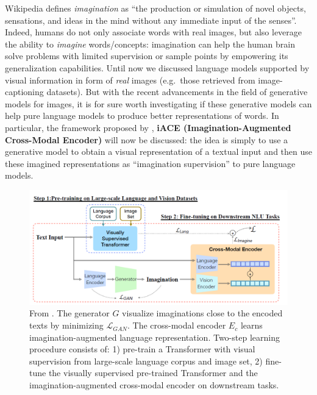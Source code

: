 \documentclass[
]{krantz}
\begin{document}
Wikipedia defines \emph{imagination} as ``the production or simulation of novel objects, sensations, and ideas in the mind without any immediate input of the senses''. Indeed, humans do not only associate words with real images, but also leverage the ability to \emph{imagine} words/concepts: imagination can help the human brain solve problems with limited supervision or sample points by empowering its generalization capabilities. Until now we discussed language models supported by visual information in form of \emph{real} images (e.g.~those retrieved from image-captioning datasets). But with the recent advancements in the field of generative models for images, it is for sure worth investigating if these generative models can help pure language models to produce better representations of words. In particular, the framework proposed by \citet{lu2022imagination}, \textbf{iACE (Imagination-Augmented Cross-Modal Encoder)} will now be discussed: the idea is simply to use a generative model to obtain a visual representation of a textual input and then use these imagined representations as ``imagination supervision'' to pure language models.

\begin{figure}

{\centering \includegraphics[width=1\linewidth]{figures/02-03-img-support-text/img-lu2022-01} 

}

\caption{From \citet{lu2022imagination}. The generator \(G\) visualize imaginations close to the encoded texts by minimizing \(\mathcal{L}_{GAN}\). The cross-modal encoder \(E_c\) learns imagination-augmented language representation. Two-step learning procedure consists of: 1) pre-train a Transformer with visual supervision from large-scale language corpus and image set, 2) fine-tune the visually supervised pre-trained Transformer and the imagination-augmented cross-modal encoder on downstream tasks.}\label{fig:img-lu2022-01}
\end{figure}
\end{document}
